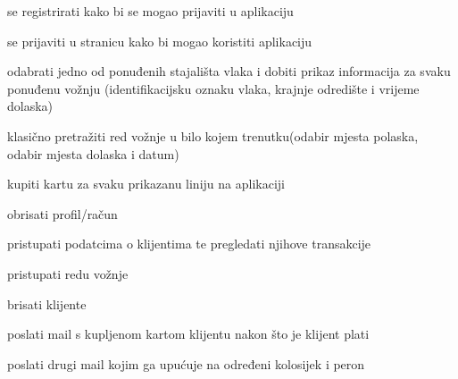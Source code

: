 			
			\begin{packed_enum}
				\item  {}
				
				\begin{packed_enum}
					
					\item se registrirati kako bi se mogao prijaviti u aplikaciju
					
				\end{packed_enum}
			
				\item  {}
				
				\begin{packed_enum}
					
					\item se prijaviti u stranicu kako bi mogao koristiti aplikaciju
					\item odabrati jedno od ponuđenih stajališta vlaka i dobiti prikaz informacija za svaku ponuđenu vožnju (identifikacijsku oznaku vlaka, krajnje odredište i vrijeme dolaska)
					\item klasično pretražiti red
vožnje u bilo kojem trenutku(odabir mjesta polaska, odabir mjesta dolaska i datum)
					\item kupiti kartu za svaku prikazanu liniju na aplikaciji
					\item obrisati profil/račun
					
				\end{packed_enum}
				
				\item  {}
				
				\begin{packed_enum}
					
					\item pristupati podatcima o klijentima te pregledati njihove transakcije
					\item pristupati redu vožnje
					\item brisati klijente
					
				\end{packed_enum}				
				
				\item  {}
				
				\begin{packed_enum}
					
					\item poslati mail s kupljenom kartom klijentu nakon što je klijent plati
					\item poslati drugi mail kojim ga upućuje na određeni kolosijek i peron
					

\end{packed_enum}
\end{packed_enum}
